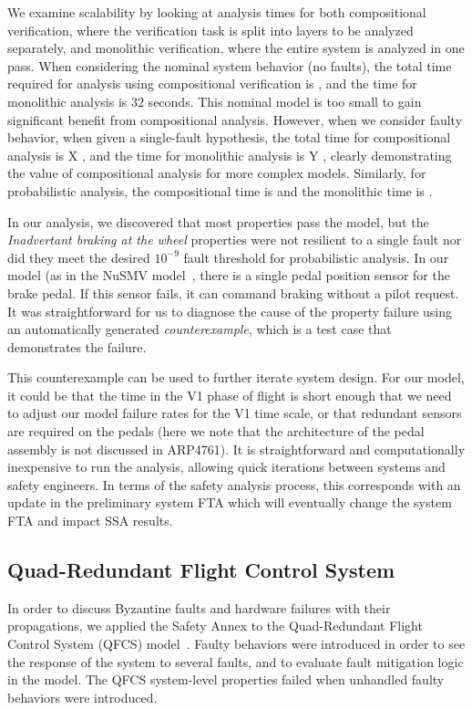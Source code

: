 We examine scalability by looking at analysis times for both compositional verification, where the verification task is split into layers to be analyzed separately, and monolithic verification, where the entire system is analyzed in one pass.  When considering the nominal system behavior (no faults), the total time required for analysis using compositional verification is , and the time for monolithic analysis is 32 seconds.  This nominal model is too small to gain significant benefit from compositional analysis.  However, when we consider faulty behavior, when given a single-fault hypothesis, the total time for compositional analysis is X , and the time for monolithic analysis is Y , clearly demonstrating the value of compositional analysis for more complex models.  Similarly, for probabilistic analysis, the compositional time is  and the monolithic time is .

In our analysis, we discovered that most properties pass the model, but the \textit{Inadvertant braking at the wheel} properties were not resilient to a single fault nor did they meet the desired $10^{-9}$ fault threshold for probabilistic analysis.  In our model (as in the NuSMV model~\cite{DBLP:conf/cav/BozzanoCPJKPRT15}, there is a single pedal position sensor for the brake pedal.  If this sensor fails, it can command braking without a pilot request.  It was straightforward for us to diagnose the cause of the property failure using an automatically generated {\em counterexample}, which is a test case that demonstrates the failure.  

This counterexample can be used to further iterate system design.  For our model, it could be that the time in the V1 phase of flight is short enough that we need to adjust our model failure rates for the V1 time scale, or that redundant sensors are required on the pedals (here we note that the architecture of the pedal assembly is not discussed in ARP4761).  It is straightforward and computationally inexpensive to run the analysis, allowing quick iterations between systems and safety engineers.
In terms of the safety analysis process, this corresponds with an update in the preliminary system FTA which will eventually change the system FTA and impact SSA results.

\subsection{Quad-Redundant Flight Control System}
In order to discuss Byzantine faults and hardware failures with their propagations, we applied the Safety Annex to the Quad-Redundant Flight Control System (QFCS) model~\cite{QFCS15:backes}. Faulty behaviors were introduced in order to see the response of the system to several faults, and to evaluate fault mitigation logic in the model. The QFCS system-level properties failed when unhandled faulty behaviors were introduced.

